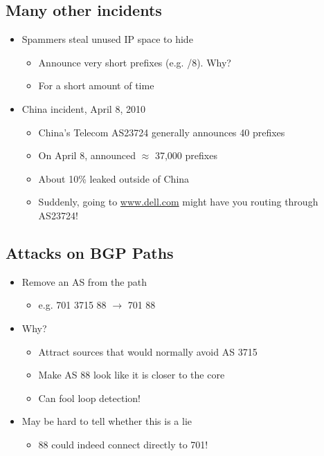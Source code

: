 \subsection{Many other incidents}
\begin{itemize}[nosep]
    \item Spammers steal unused IP space to hide
          \begin{itemize}[nosep]
              \item Announce very short prefixes (e.g. /8). Why?
              \item For a short amount of time
          \end{itemize}
    \item China incident, April 8, 2010
          \begin{itemize}[nosep]
              \item China's Telecom AS23724 generally announces 40 prefixes
              \item On April 8, announced $\approx$ 37,000 prefixes
              \item About 10\% leaked outside of China
              \item Suddenly, going to \url{www.dell.com} might have you routing through AS23724!
          \end{itemize}
\end{itemize}

\subsection{Attacks on BGP Paths}
\begin{itemize}[nosep]
    \item Remove an AS from the path
          \begin{itemize}[nosep]
              \item e.g. 701 3715 88 $\to$ 701 88
          \end{itemize}
    \item Why?
          \begin{itemize}[nosep]
              \item Attract sources that would normally avoid AS 3715
              \item Make AS 88 look like it is closer to the core
              \item Can fool loop detection!
          \end{itemize}
    \item May be hard to tell whether this is a lie
          \begin{itemize}[nosep]
              \item 88 could indeed connect directly to 701!
          \end{itemize}
\end{itemize}

